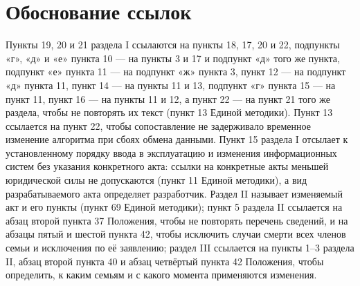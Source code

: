 \documentclass[14pt,a4paper]{extarticle}
\begin{document}
\section{Обоснование ссылок}
Пункты 19, 20 и 21 раздела I ссылаются на пункты 18, 17, 20 и 22, подпункты «г», «д» и «е» пункта 10 — на пункты 3 и 17 и подпункт «д» того же пункта, подпункт «е» пункта 11 — на подпункт «ж» пункта 3, пункт 12 — на подпункт «д» пункта 11, пункт 14 — на пункты 11 и 13, подпункт «г» пункта 15 — на пункт 11, пункт 16 — на пункты 11 и 12, а пункт 22 — на пункт 21 того же раздела, чтобы не повторять их текст (пункт 13 Единой методики). Пункт 13 ссылается на пункт 22, чтобы сопоставление не задерживало временное изменение алгоритма при сбоях обмена данными. Пункт 15 раздела I отсылает к установленному порядку ввода в эксплуатацию и изменения информационных систем без указания конкретного акта: ссылки на конкретные акты меньшей юридической силы не допускаются (пункт 11 Единой методики), а вид разрабатываемого акта определяет разработчик. Раздел II называет изменяемый акт и его пункты (пункт 69 Единой методики); пункт 5 раздела II ссылается на абзац второй пункта 37 Положения, чтобы не повторять перечень сведений, и на абзацы пятый и шестой пункта 42, чтобы исключить случаи смерти всех членов семьи и исключения по её заявлению; раздел III ссылается на пункты 1–3 раздела II, абзац второй пункта 40 и абзац четвёртый пункта 42 Положения, чтобы определить, к каким семьям и с какого момента применяются изменения.
\end{document}
